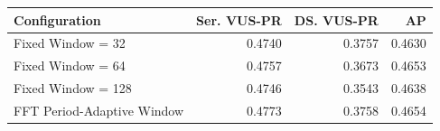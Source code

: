 \begin{tabular}{lrrr}
\toprule
Configuration & Ser. VUS-PR & DS. VUS-PR & AP \\
\midrule
Fixed Window = 32 & 0.4740 & 0.3757 & 0.4630 \\
Fixed Window = 64 & 0.4757 & 0.3673 & 0.4653 \\
Fixed Window = 128 & 0.4746 & 0.3543 & 0.4638 \\
FFT Period-Adaptive Window & 0.4773 & 0.3758 & 0.4654 \\
\bottomrule
\end{tabular}